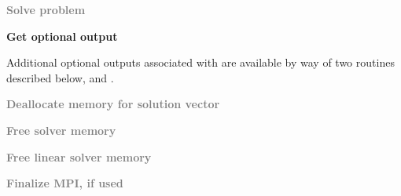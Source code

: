 \begin{Steps}
\item
  \textcolor{gray}{\bf Solve problem}

\item
  {\bf Get optional output}

  Additional optional outputs associated with {\kinbbdpre} are available by
  way of two routines described below,
   and .

\item
  \textcolor{gray}{\bf Deallocate memory for solution vector}

\item
  \textcolor{gray}{\bf Free solver memory}

\item
  \textcolor{gray}{\bf Free linear solver memory}

\item
  \textcolor{gray}{\bf Finalize MPI, if used}

\end{Steps}

